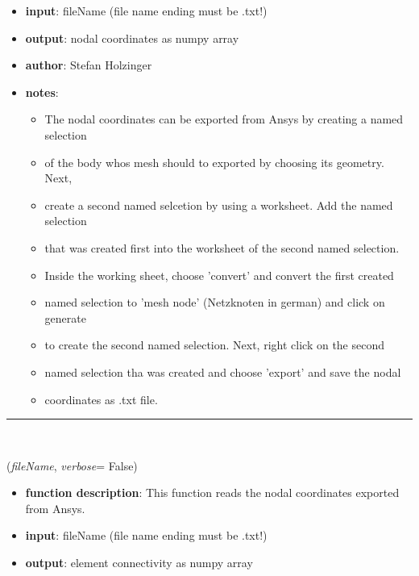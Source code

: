 \begin{itemize}[leftmargin=1.4cm]
\begin{itemize}[leftmargin=1.4cm]
\begin{itemize}[leftmargin=1.4cm]
\begin{itemize}[leftmargin=0.5cm]
\begin{itemize}[leftmargin=1.4cm]
\begin{itemize}[leftmargin=1.4cm]
\begin{itemize}[leftmargin=1.4cm]
\begin{itemize}[leftmargin=0.5cm]
\begin{itemize}[leftmargin=0.7cm]
\item[--]
{\bf input}: fileName (file name ending must be .txt!)
\item[--]
{\bf output}: nodal coordinates as numpy array
\item[--]
{\bf author}: Stefan Holzinger
\item[--]
{\bf notes}: \vspace{-6pt}
\begin{itemize}[leftmargin=1.2cm]
\setlength{\itemindent}{-0.7cm}
\item[]The nodal coordinates can be exported from Ansys by creating a named selection
\item[]of the body whos mesh should to exported by choosing its geometry. Next,
\item[]create a second named selcetion by using a worksheet. Add the named selection
\item[]that was created first into the worksheet of the second named selection.
\item[]Inside the working sheet, choose 'convert' and convert the first created
\item[]named selection to 'mesh node' (Netzknoten in german) and click on generate
\item[]to create the second named selection. Next, right click on the second
\item[]named selection tha was created and choose 'export' and save the nodal
\item[]coordinates as .txt file.
\end{itemize}
\vspace{12pt}\end{itemize}
%
\noindent\rule{8cm}{0.75pt}\vspace{1pt} \\ 
\begin{flushleft}
\label{sec:FEM:ReadElementsFromAnsysTxt}
({\it fileName}, {\it verbose}= False)
\end{flushleft}
\setlength{\itemindent}{0.7cm}
\begin{itemize}[leftmargin=0.7cm]
\item[--]
{\bf function description}: This function reads the nodal coordinates exported from Ansys.
\item[--]
{\bf input}: fileName (file name ending must be .txt!)
\item[--]
{\bf output}: element connectivity as numpy array

\end{itemize}
\end{itemize}
\end{itemize}
\end{itemize}
\end{itemize}
\end{itemize}
\end{itemize}
\end{itemize}
\end{itemize}
